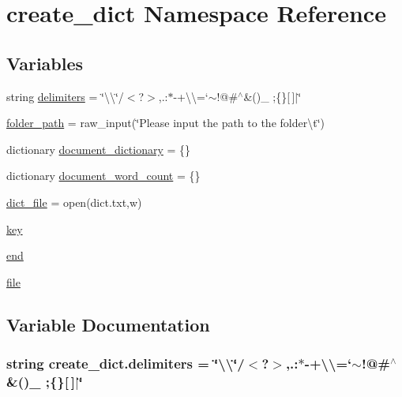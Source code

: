 \hypertarget{namespacecreate__dict}{}\section{create\+\_\+dict Namespace Reference}
\label{namespacecreate__dict}
\subsection*{Variables}
\begin{DoxyCompactItemize}
\item 
string \hyperlink{namespacecreate__dict_ae4975e370ff334361b3a0938678c09f6}{delimiters} = \char`\"{}\textbackslash{}\textquotesingle{}\textbackslash{}\char`\"{}/$<$?$>$,.\+:$\ast$-\/+\textbackslash{}\textbackslash{}=`$\sim$!@\#$^\wedge$\&()\+\_\+ ;\{\}\mbox{[}$\,$\mbox{]}$\vert$\char`\"{}
\item 
\hyperlink{namespacecreate__dict_a94c0ed0928396d28700235a31621124f}{folder\+\_\+path} = raw\+\_\+input(\char`\"{}Please input the path to the folder\textbackslash{}t\char`\"{})
\item 
dictionary \hyperlink{namespacecreate__dict_a523b5abb183f92cbb473ab778d8c7d9f}{document\+\_\+dictionary} = \{\}
\item 
dictionary \hyperlink{namespacecreate__dict_afb09c644d11be14d22d9c194ce8904fb}{document\+\_\+word\+\_\+count} = \{\}
\item 
\hyperlink{namespacecreate__dict_ac24c44c9b8b29bc8a8411916d7a6b349}{dict\+\_\+file} = open(\textquotesingle{}dict.\+txt\textquotesingle{},\textquotesingle{}w\textquotesingle{})
\item 
\hyperlink{namespacecreate__dict_aef9478241bf84f48b590aab0c0bbfc63}{key}
\item 
\hyperlink{namespacecreate__dict_ad4b19f0708a580bdf8ef5f3b5a08d1d2}{end}
\item 
\hyperlink{namespacecreate__dict_a0384d7d11a827e9e7084abff1ac79190}{file}
\end{DoxyCompactItemize}


\subsection{Variable Documentation}
\subsubsection[{\texorpdfstring{delimiters}{delimiters}}]{\setlength{\rightskip}{0pt plus 5cm}string create\+\_\+dict.\+delimiters = \char`\"{}\textbackslash{}\textquotesingle{}\textbackslash{}\char`\"{}/$<$?$>$,.\+:$\ast$-\/+\textbackslash{}\textbackslash{}=`$\sim$!@\#$^\wedge$\&()\+\_\+ ;\{\}\mbox{[}$\,$\mbox{]}$\vert$\char`\"{}}\hypertarget{namespacecreate__dict_ae4975e370ff334361b3a0938678c09f6}{}\label{namespacecreate__dict_ae4975e370ff334361b3a0938678c09f6}


